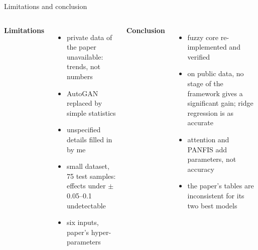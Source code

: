 \documentclass[aspectratio=169,10pt]{beamer}
\begin{document}
\begin{frame}{Limitations and conclusion}
\begin{columns}[T]
\textbf{Limitations}
\begin{itemize}
\item private data of the paper unavailable: trends, not numbers
\item AutoGAN replaced by simple statistics
\item unspecified details filled in by me
\item small dataset, 75 test samples: effects under $\pm$0.05--0.1 undetectable
\item six inputs, paper's hyper-parameters
\end{itemize}
\textbf{Conclusion}
\begin{itemize}
\item fuzzy core re-implemented and verified
\item on public data, no stage of the framework gives a significant gain; ridge regression is as accurate
\item attention and PANFIS add parameters, not accuracy
\item the paper's tables are inconsistent for its two best models
\end{itemize}
\end{columns}
\end{frame}
\end{document}
